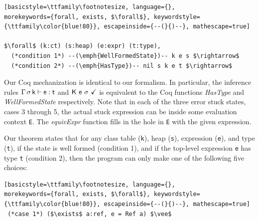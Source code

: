 \documentclass[runnningheads]{tex/llncs}
\begin{document}
\begin{lstlisting}[basicstyle=\ttfamily\footnotesize, language={}, 
morekeywords={forall, exists, $\forall$}, keywordstyle={\ttfamily\color{blue!80}}, escapeinside={--(}{)--}, mathescape=true]

$\forall$ (k:ct) (s:heap) (e:expr) (t:type),
  (*condition 1*) --(\emph{WellFormedState})-- k e s $\rightarrow$ 
  (*condition 2*) --(\emph{HasType})-- nil s k e t $\rightarrow$ 
\end{lstlisting}

Our Coq mechanization is identical to our formalism. In particular, the
inference rules $\EnvType\Env\s\k\e\t$ and $\WFq{\K~\e~\s}$ is equivalent 
to the Coq functions \emph{HasType} and \emph{WellFormedState} respectively. 
Note that in each of the three error stuck states, cases 3 through 5, the actual stuck
expression can be inside some evaluation context \verb|E|. The \emph{equivExpr} function
fills in the hole in \verb|E| with the given expression.

Our theorem states that for any class table (\verb|k|), heap
(\verb|s|), expression (\verb|e|), and type (\verb|t|), if the state is well
formed (condition 1), and if the top-level expression \verb|e| has type
\verb|t| (condition 2), then the program can only make one of the following
five choices:

\begin{lstlisting}[basicstyle=\ttfamily\footnotesize, language={}, 
morekeywords={forall, exists, $\forall$}, keywordstyle={\ttfamily\color{blue!80}}, escapeinside={--(}{)--}, mathescape=true]  
 (*case 1*) ($\exists$ a:ref, e = Ref a) $\vee$
\end{lstlisting}
\end{document}
